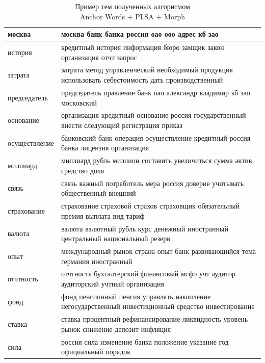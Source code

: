 \documentclass[a4paper, 14pt]{extarticle}
\begin{document}
\begin{landscape}
	\begin{small}
		\begin{singlespace}
			\begin{table}[h]
			\centering
			\caption{Пример тем полученных алгоритмом \\ Anchor Words + PLSA + Morph}
			\label{my-label}
				\begin{tabular}{|l|l|}
				\hline
				москва &  москва банк банка россия оао ооо адрес кб зао \\ \hline
				история &  кредитный история информация бюро замщик закон организация отчт запрос \\ \hline
				затрата &  затрата метод управленческий необходимый продукция использовать себестоимость дать производственный \\ \hline
				председатель &  председатель правление банк оао александр владимир кб зао московский \\ \hline
				основание &  организация кредитный основание россия государственный внести следующий регистрация приказ \\ \hline
				осуществление &  банковский банк операция осуществление кредитный россия банка лицензия организация \\ \hline
				миллиард &  миллиард рубль миллион составить увеличиться сумма актив средство доля \\ \hline
				связь &  связь важный потребитель мера россия доверие учитывать общественный внешний \\ \hline
				страхование &  страхование страховой страхов страховщик обязательный премия выплата вид тариф \\ \hline
				валюта &  валюта валютный рубль курс денежный иностранный центральный национальный резерв \\ \hline
				опыт &  международный рынок страна опыт банк развивающийся тема германия иностранный \\ \hline
				отчтность &  отчтность бухгалтерский финансовый мсфо учт аудитор аудиторский учтный организация \\ \hline
				фонд &  фонд пенсионный пенсия управлять накопление негосударственный инвестиционный средство инвестирование \\ \hline
				ставка &  ставка процентный рефинансирование ликвидность уровень рынок снижение депозит инфляция \\ \hline
				сила &  россия сила изменение банка положение указание год официальный порядок \\ \hline

\end{tabular}
\end{table}
\end{singlespace}
\end{small}
\end{landscape}
\end{document}
